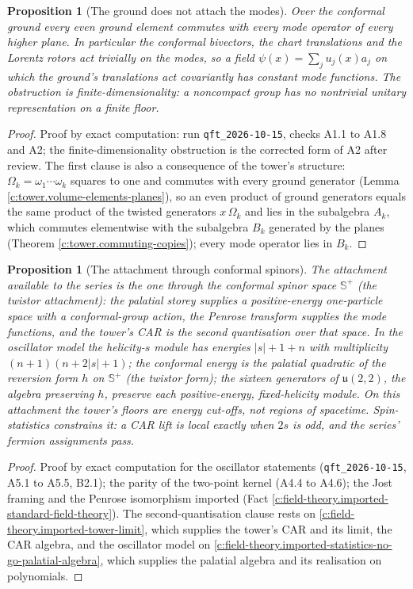 \documentclass[11pt]{article}
\newtheorem{proposition}[theorem]{Proposition}
\theoremstyle{definition}
\theoremstyle{plain}
\providecommand{\CS}{}\renewcommand{\CS}{{\mathbb{S}^{+}}}
\begin{document}
\begin{proposition}[The ground does not attach the modes]\label{c:field-theory.ground-does-not-attach-modes}
Over the conformal ground every even ground element commutes with every mode operator of every higher plane. In particular the conformal bivectors, the chart translations and the Lorentz rotors act trivially on the modes, so a field $\psi(x) = \sum_j u_j(x)a_j$ on which the ground's translations act covariantly has constant mode functions. The obstruction is finite-dimensionality: a noncompact group has no nontrivial unitary representation on a finite floor.
\end{proposition}
\begin{proof}
Proof by exact computation: run \texttt{qft\_2026-10-15}, checks A1.1 to A1.8 and A2; the finite-dimensionality obstruction is the corrected form of A2 after review. The first clause is also a consequence of the tower's structure: $\Omega_{k} = \omega_{1}\cdots\omega_{k}$ squares to one and commutes with every ground generator (Lemma \ref{c:tower.volume-elements-planes}), so an even product of ground generators equals the same product of the twisted generators $x\,\Omega_{k}$ and lies in the subalgebra $A_{k}$, which commutes elementwise with the subalgebra $B_{k}$ generated by the planes (Theorem \ref{c:tower.commuting-copies}); every mode operator lies in $B_{k}$.

\end{proof}

\begin{proposition}[The attachment through conformal spinors]\label{c:field-theory.twistor-attachment}
The attachment available to the series is the one through the conformal spinor space $\CS$ (the twistor attachment): the palatial storey supplies a positive-energy one-particle space with a conformal-group action, the Penrose transform supplies the mode functions, and the tower's CAR is the second quantisation over that space. In the oscillator model the helicity-$s$ module has energies $|s| + 1 + n$ with multiplicity $(n+1)(n + 2|s| + 1)$; the conformal energy is the palatial quadratic of the reversion form $h$ on $\CS$ (the twistor form); the sixteen generators of $\mathfrak{u}(2,2)$, the algebra preserving $h$, preserve each positive-energy, fixed-helicity module. On this attachment the tower's floors are energy cut-offs, not regions of spacetime. Spin-statistics constrains it: a CAR lift is local exactly when $2s$ is odd, and the series' fermion assignments pass.
\end{proposition}
\begin{proof}
Proof by exact computation for the oscillator statements (\texttt{qft\_2026-10-15}, A5.1 to A5.5, B2.1); the parity of the two-point kernel (A4.4 to A4.6); the Jost framing and the Penrose isomorphism imported (Fact \ref{c:field-theory.imported-standard-field-theory}). The second-quantisation clause rests on \ref{c:field-theory.imported-tower-limit}, which supplies the tower's CAR and its limit, the CAR algebra, and the oscillator model on \ref{c:field-theory.imported-statistics-no-go-palatial-algebra}, which supplies the palatial algebra and its realisation on polynomials.

\end{proof}
\end{document}
